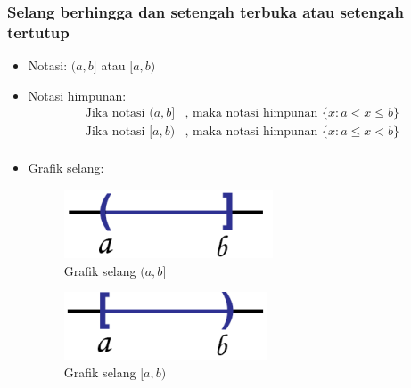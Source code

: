 \documentclass[pdflatex,compress,mathserif]{beamer}
\begin{document}
		\begin{frame}
			\frametitle{Selang berhingga dan setengah terbuka atau setengah tertutup}
			\begin{itemize}
				\item Notasi: $ (a,b] $ atau $ [a,b) $
				\item Notasi himpunan:
				\begin{align*}
					\text{Jika notasi } (a,b] & \text{, maka notasi himpunan }\{x:a < x \leq b\} \\
					\text{Jika notasi } [a,b) & \text{, maka notasi himpunan }\{x:a \leq x < b\} \\
				\end{align*}
				\item Grafik selang:
				\begin{multicols}{2}
					\begin{figure}
						\centering
						\includegraphics[width=0.5\linewidth]{pict/04}
						\caption{Grafik selang $(a,b]$}
						\label{fig:04}
					\end{figure}
					\columnbreak
					\begin{figure}
						\centering
						\includegraphics[width=0.5\linewidth]{pict/05}
						\caption{Grafik selang $[a,b)$}
						\label{fig:05}
					\end{figure}
				\end{multicols}
			\end{itemize}
		\end{frame}
		
\end{document}
